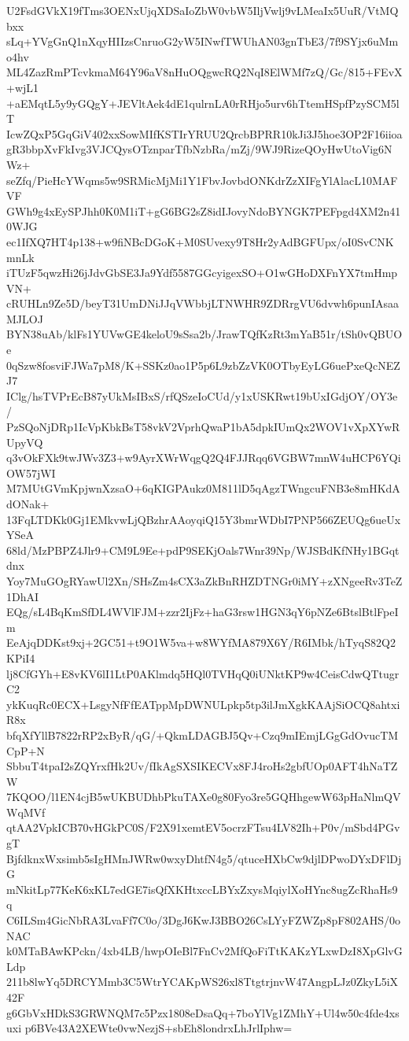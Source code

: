 U2FsdGVkX19fTms3OENxUjqXDSaIoZbW0vbW5IljVwlj9vLMeaIx5UuR/VtMQbxx
sLq+YVgGnQ1nXqyHIIzsCnruoG2yW5INwfTWUhAN03gnTbE3/7f9SYjx6uMmo4hv
ML4ZazRmPTcvkmaM64Y96aV8nHuOQgwcRQ2NqI8ElWMf7zQ/Gc/815+FEvX+wjL1
+aEMqtL5y9yGQgY+JEVltAek4dE1qulrnLA0rRHjo5urv6hTtemHSpfPzySCM5lT
IcwZQxP5GqGiV402xxSowMIfKSTIrYRUU2QrcbBPRR10kJi3J5hoe3OP2F16iioa
gR3bbpXvFkIvg3VJCQysOTznparTfbNzbRa/mZj/9WJ9RizeQOyHwUtoVig6NWz+
seZfq/PieHcYWqms5w9SRMicMjMi1Y1FbvJovbdONKdrZzXIFgYlAlacL10MAFVF
GWh9g4xEySPJhh0K0M1iT+gG6BG2sZ8idIJovyNdoBYNGK7PEFpgd4XM2n410WJG
ec1IfXQ7HT4p138+w9fiNBcDGoK+M0SUvexy9T8Hr2yAdBGFUpx/oI0SvCNKmnLk
iTUzF5qwzHi26jJdvGbSE3Ja9Ydf5587GGcyigexSO+O1wGHoDXFnYX7tmHmpVN+
cRUHLn9Ze5D/beyT31UmDNiJJqVWbbjLTNWHR9ZDRrgVU6dvwh6punIAsaaMJLOJ
BYN38uAb/klFs1YUVwGE4keloU9sSsa2b/JrawTQfKzRt3mYaB51r/tSh0vQBUOe
0qSzw8fosviFJWa7pM8/K+SSKz0ao1P5p6L9zbZzVK0OTbyEyLG6uePxeQcNEZJ7
IClg/hsTVPrEcB87yUkMsIBxS/rfQSzeIoCUd/y1xUSKRwt19bUxIGdjOY/OY3e/
PzSQoNjDRp1IcVpKbkBsT58vkV2VprhQwaP1bA5dpkIUmQx2WOV1vXpXYwRUpyVQ
q3vOkFXk9twJWv3Z3+w9AyrXWrWqgQ2Q4FJJRqq6VGBW7mnW4uHCP6YQiOW57jWI
M7MUtGVmKpjwnXzsaO+6qKIGPAukz0M811lD5qAgzTWngcuFNB3e8mHKdAdONak+
13FqLTDKk0Gj1EMkvwLjQBzhrAAoyqiQ15Y3bmrWDbI7PNP566ZEUQg6ueUxYSeA
68ld/MzPBPZ4Jlr9+CM9L9Ee+pdP9SEKjOals7Wnr39Np/WJSBdKfNHy1BGqtdnx
Yoy7MuGOgRYawUl2Xn/SHsZm4sCX3aZkBnRHZDTNGr0iMY+zXNgeeRv3TeZ1DhAI
EQg/sL4BqKmSfDL4WVlFJM+zzr2IjFz+haG3rsw1HGN3qY6pNZe6BtslBtlFpeIm
EeAjqDDKst9xj+2GC51+t9O1W5va+w8WYfMA879X6Y/R6IMbk/hTyqS82Q2KPiI4
lj8CfGYh+E8vKV6lI1LtP0AKlmdq5HQl0TVHqQ0iUNktKP9w4CeisCdwQTtugrC2
ykKuqRc0ECX+LsgyNfFfEATppMpDWNULpkp5tp3ilJmXgkKAAjSiOCQ8ahtxiR8x
bfqXfYllB7822rRP2xByR/qG/+QkmLDAGBJ5Qv+Czq9mIEmjLGgGdOvucTMCpP+N
SbbuT4tpaI2sZQYrxfHk2Uv/fIkAgSXSIKECVx8FJ4roHs2gbfUOp0AFT4hNaTZW
7KQOO/l1EN4cjB5wUKBUDhbPkuTAXe0g80Fyo3re5GQHhgewW63pHaNlmQVWqMVf
qtAA2VpkICB70vHGkPC0S/F2X91xemtEV5ocrzFTsu4LV82Ih+P0v/mSbd4PGvgT
BjfdknxWxsimb5sIgHMnJWRw0wxyDhtfN4g5/qtuceHXbCw9djlDPwoDYxDFlDjG
mNkitLp77KeK6xKL7edGE7isQfXKHtxccLBYxZxysMqiylXoHYnc8ugZcRhaHs9q
C6ILSm4GicNbRA3LvaFf7C0o/3DgJ6KwJ3BBO26CsLYyFZWZp8pF802AHS/0oNAC
k0MTaBAwKPckn/4xb4LB/hwpOIeBl7FnCv2MfQoFiTtKAKzYLxwDzI8XpGlvGLdp
211b8lwYq5DRCYMmb3C5WtrYCAKpWS26xl8TtgtrjnvW47AngpLJz0ZkyL5iX42F
g6GbVxHDkS3GRWNQM7c5Pzx1808eDsaQq+7boYlVg1ZMhY+Ul4w50c4fde4xsuxi
p6BVe43A2XEWte0vwNezjS+sbEh8londrxLhJrlIphw=

